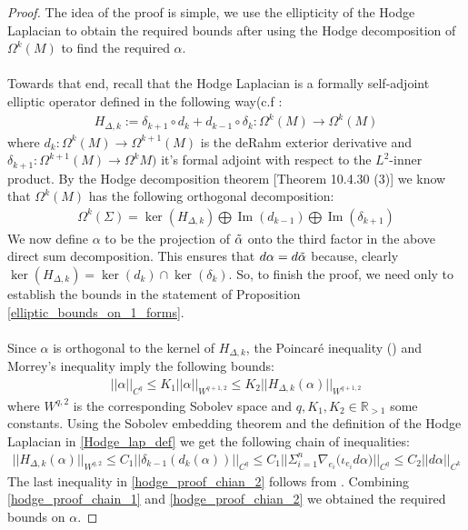\documentclass[11pt]{amsart}
\theoremstyle{plain}
\theoremstyle{definition}
\theoremstyle{remark}
\DeclareMathOperator{\Ima}{Im}
\begin{document}
\begin{proof}
The idea of the proof is simple, we use the ellipticity of the Hodge Laplacian to obtain the required bounds after using the Hodge decomposition of $\Omega^k(M)$ to find the required $\alpha$.\\
\\
Towards that end, recall that the Hodge Laplacian is a formally self-adjoint elliptic operator defined in the following way(c.f \cite[10.1.22 \& 10.1.29]{Nicolaescu1996LecturesOT}:
\begin{align}\label{Hodge_lap_def}
    H_{\Delta,k}:= \delta_{k+1} \circ d_{k} + d_{k-1}\circ \delta_{k} : \Omega^k(M) \rightarrow \Omega^k(M) 
\end{align}
where $d_k: \Omega^k(M) \rightarrow \Omega^{k+1}(M)$ is the deRahm exterior derivative and $\delta_{k+1}: \Omega^{k+1}(M) \rightarrow \Omega^{k}M)$ it's formal adjoint with respect to the $L^2$-inner product. By the Hodge decomposition theorem \cite{Nicolaescu1996LecturesOT}[Theorem 10.4.30 (3)] we know that $\Omega^k(M)$ has the following orthogonal decomposition:
\begin{align*}
    \Omega^k(\Sigma)= \ker(H_{\Delta,k}) \bigoplus \Ima(d_{k-1}) \bigoplus \Ima (\delta_{k+1})
\end{align*}
We now define $\alpha$ to be the projection of $\Tilde{\alpha}$ onto the third factor in the above direct sum decomposition. This ensures that $d\alpha = d\Tilde{\alpha}$ because, clearly $\ker (H_{\Delta,k})= \ker (d_k) \cap \ker (\delta_{k})$. So, to finish the proof, we need only to establish the bounds in the statement of Proposition \ref{elliptic_bounds_on_1_forms}. \\
\\
Since $\alpha$ is orthogonal to the kernel of $H_{\Delta,k}$, the Poincar\'e inequality (\cite[Lemma 10.4.9]{Nicolaescu1996LecturesOT}) and Morrey's inequality \cite[10.2.36 (d)]{Nicolaescu1996LecturesOT} imply the following bounds:
\begin{align}\label{hodge_proof_chain_1}
   ||\alpha||_{C^q} \leq K_1 ||\alpha||_{W^{q+1,2}} \leq K_2 ||H_{\Delta,k}(\alpha)||_{W^{q+1,2}}
\end{align}
where $W^{q,2}$ is the corresponding Sobolev space and $q,K_1,K_2 \in \mathbb{R}_{>1}$ some constants. Using the Sobolev embedding theorem and the definition of the Hodge Laplacian in \eqref{Hodge_lap_def} we get the following chain of inequalities:
\begin{align}\label{hodge_proof_chian_2}
    ||H_{\Delta,k}(\alpha)||_{W^{q,2}} \leq C_1 ||\delta_{k-1}(d_k(\alpha))||_{C^q} \leq C_1||\Sigma^n_{i=1} \nabla_{e_i}\big(\iota_{e_i} d\alpha\big)||_{C^q} \leq C_2||d\alpha ||_{C^k} 
\end{align}
The last inequality in \eqref{hodge_proof_chian_2} follows from \cite[Chapter 4, Lemma 4.6]{lee2018introduction}. Combining \eqref{hodge_proof_chain_1} and \eqref{hodge_proof_chian_2} we obtained the required bounds on $\alpha$. 
\end{proof}
\end{document}
